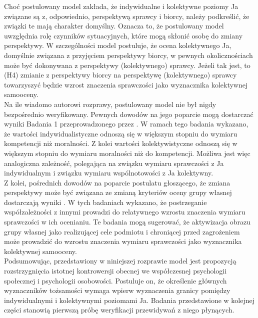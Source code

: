 \documentclass[man]{apa6}
\begin{document}
Choć postulowany model zakłada, że indywidualne i kolektywne poziomy Ja związane są z, odpowiednio, perspektywą sprawcy i biorcy, należy podkreślić, że związki te mają charakter domyślny. Oznacza to, że postulowany model uwzględnia rolę czynników sytuacyjnych, które mogą skłonić osobę do zmiany perspektywy. W szczególności model postuluje, że ocena kolektywnego Ja, domyślnie związana z przyjęciem perspektywy biorcy, w pewnych okolicznościach może być dokonywana z perspektywy (kolektywnego) sprawcy. Jeżeli tak jest, to (H4) zmianie z perspektywy biorcy na perspektywę (kolektywnego) sprawcy towarzyszyć będzie wzrost znaczenia sprawczości jako wyznacznika kolektywnej samooceny.\\

Na ile wiadomo autorowi rozprawy, postulowany model nie był nigdy bezpośrednio weryfikowany. Pewnych dowodów na jego poparcie mogą dostarczać wyniki Badania 1 przeprowadzonego przez \textcite{wojciszke1997parallels}. W ramach tego badania wykazano, że wartości indywidualistyczne odnoszą się w większym stopniu do wymiaru kompetencji niż moralności. Z kolei wartości kolektywistyczne odnoszą się w większym stopniu do wymiaru moralności niż do kompetencji. Możliwa jest więc analogiczna zależność, polegająca na związku wymiaru sprawczości z Ja indywidualnym i związku wymiaru wspólnotowości z Ja kolektywny.\\

Z kolei, pośrednich dowodów na poparcie postulatu głoszącego, że zmiana perspektywy może być związana ze zmianą kryteriów oceny grupy własnej dostarczają wyniki \textcite{wojciszke2008primacy}. W tych badaniach wykazano, że postrzeganie współzależności z innymi prowadzi do relatywnego wzrostu znaczenia wymiaru sprawczości w ich ocenianiu. Te badania mogą sugerować, że aktywizacja obrazu grupy własnej jako realizującej cele podmiotu i chroniącej przed zagrożeniem może prowadzić do wzrostu znaczenia wymiaru sprawczości jako wyznacznika kolektywnej samooceny.\\

Podsumowując, przedstawiony w niniejszej rozprawie model jest propozycją rozstrzygnięcia istotnej kontrowersji obecnej we współczesnej psychologii społecznej i psychologii osobowości. Postuluje on, że określenie głównych wyznaczników tożsamości wymaga wpierw wyznaczenia granicy pomiędzy indywidualnymi i kolektywnymi poziomami Ja. Badania przedstawione w kolejnej części stanowią pierwszą próbę weryfikacji przewidywań z niego płynących.\\
\end{document}
